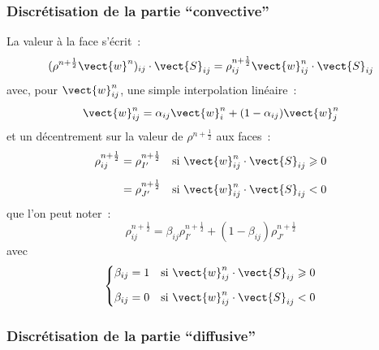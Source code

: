 \subsubsection*{Discrétisation de la partie ``convective''}

La valeur à la face s'écrit~:
\begin{equation}
(\rho^{n+\frac{1}{2}} \vect{w}^n)_{ij} \cdot \vect{S}_{ij}
= \rho^{n+\frac{1}{2}}_{ij} \vect{w}^n_{ij} \cdot \vect{S}_{ij}
\end{equation}
avec, pour $\vect{w}^n_{ij}$,
une simple interpolation linéaire~:
\begin{equation}
\vect{w}^n_{ij}
= \alpha_{ij} \vect{w}^n_i + (1-\alpha_{ij}) \vect{w}^n_j
\end{equation}
et un décentrement sur la valeur de $\rho^{n+\frac{1}{2}}$ aux faces~:
\begin{equation}
\begin{aligned}
\displaystyle\rho_{ij}^{n+\frac{1}{2}} &= \rho_{I'}^{n+\frac{1}{2}}
&\text{si\ }& \vect{w}^n_{ij} \cdot \vect{S}_{ij} \geqslant 0 \\[0.5em]
&= \rho_{J'}^{n+\frac{1}{2}}
&\text{si\ }& \vect{w}^n_{ij} \cdot \vect{S}_{ij} < 0
\end{aligned}
\end{equation}
que l'on peut noter~:
\begin{equation}
\displaystyle\rho_{ij}^{n+\frac{1}{2}}
 = \beta_{ij}\rho_{I'}^{n+\frac{1}{2}} + (1-\beta_{ij})\rho_{J'}^{n+\frac{1}{2}}
\end{equation}
avec
\begin{equation}
\left\{
\begin{aligned}
\beta_{ij} &= 1 &\text{si\ }& \vect{w}^n_{ij} \cdot \vect{S}_{ij} \geqslant 0 \\[0.5em]
\beta_{ij} &= 0 &\text{si\ }& \vect{w}^n_{ij} \cdot \vect{S}_{ij} < 0
\end{aligned}
\right.
\end{equation}

\subsubsection*{Discrétisation de la partie ``diffusive''}

